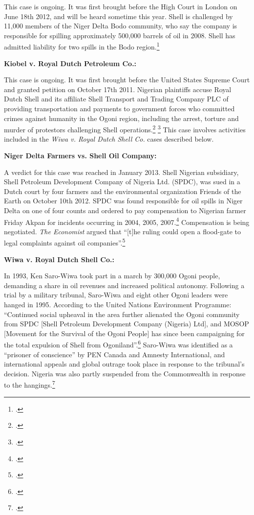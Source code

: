 \documentclass[10pt]{article}
\begin{document}
This case is ongoing. 
It was first brought before the High Court in London on June 18th 2012, and will be heard sometime this year. 
Shell is challenged by 11,000 members of the Niger Delta Bodo community, who say the company is responsible for spilling approximately 500,000 barrels of oil in 2008. 
Shell has admitted liability for two spills in the Bodo region.\footcite{DutchResponsible}



\textbf{Kiobel v. Royal Dutch Petroleum Co.:} 



This case is ongoing. 
It was first brought before the United States Supreme Court and granted petition on October 17th 2011. 
Nigerian plaintiffs accuse Royal Dutch Shell and its affiliate Shell Transport and Trading Company PLC of providing transportation and payments to government forces who committed crimes against humanity in the Ogoni region, including the arrest, torture and murder of protestors challenging Shell operations.\footcite{KiobelShell} \footcite{TortureComplicity}
This case involves activities included in the \emph{Wiwa v. Royal Dutch Shell Co.} cases described below.



\textbf{Niger Delta Farmers vs. Shell Oil Company:} 



A verdict for this case was reached in January 2013. 
Shell Nigerian subsidiary, Shell Petroleum Development Company of Nigeria Ltd. (SPDC), was sued in a Dutch court by four farmers and the environmental organization Friends of the Earth on October 10th 2012. 
SPDC was found responsible for oil spills in Niger Delta on one of four counts and ordered to pay compensation to Nigerian farmer Friday Akpan for incidents occurring in 2004, 2005, 2007.\footcite{OrderedFarmer}
Compensation is being negotiated. 
\emph{The Economist} argued that ``[t]he ruling could open a flood-gate to legal complaints against oil companies''.\footcite{MixedVerdict}



\textbf{Wiwa v. Royal Dutch Shell Co.:}



In 1993, Ken Saro-Wiwa took part in a march by 300,000 Ogoni people, demanding a share in oil revenues and increased political autonomy.
Following a trial by a military tribunal, Saro-Wiwa and eight other Ogoni leaders were hanged in 1995.
According to the United Nations Environment Programme: ``Continued social upheaval in the area further alienated the Ogoni community from SPDC [Shell Petroleum Development Company (Nigeria) Ltd], and MOSOP [Movement for the Survival of the Ogoni People] has since been campaigning for the total expulsion of Shell from Ogoniland''.\footcite[][p.27]{Ogoniland}
Saro-Wiwa was identified as a ``prisoner of conscience'' by PEN Canada and Amnesty International, and international appeals and global outrage took place in response to the tribunal's decision.
Nigeria was also partly suspended from the Commonwealth in response to the hangings.\footcite[][]{CommonwealthFor}
\end{document}
